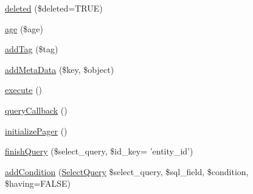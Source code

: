 \begin{DoxyCompactItemize}
\item 
\hyperlink{classEntityFieldQuery_a49543cc7ea0841ba46d4ebe310695ce3}{deleted} (\$deleted=TRUE)
\item 
\hyperlink{classEntityFieldQuery_af6fbd7296e3c833f8a31769e0c1c866a}{age} (\$age)
\item 
\hyperlink{classEntityFieldQuery_a7cfe2a721e0aee895516cd46a59c872e}{addTag} (\$tag)
\item 
\hyperlink{classEntityFieldQuery_a143d69ef04486e7b78e0f7536b89ee53}{addMetaData} (\$key, \$object)
\item 
\hyperlink{classEntityFieldQuery_ac90614418d7fb3a0c81134889fe1bcbd}{execute} ()
\item 
\hyperlink{classEntityFieldQuery_a79642d38a928c05d6741ec0948e08ddb}{queryCallback} ()
\item 
\hyperlink{classEntityFieldQuery_a53c95c5a7f8a4a419aa85fa5d6529524}{initializePager} ()
\item 
\hyperlink{classEntityFieldQuery_a764b73a57d7b7186d219d859cbf87ddd}{finishQuery} (\$select\_\-query, \$id\_\-key= 'entity\_\-id')
\item 
\hyperlink{classEntityFieldQuery_ace9480802a8dbdf23f1d7091aaf7d336}{addCondition} (\hyperlink{classSelectQuery}{SelectQuery} \$select\_\-query, \$sql\_\-field, \$condition, \$having=FALSE)
\end{DoxyCompactItemize}
